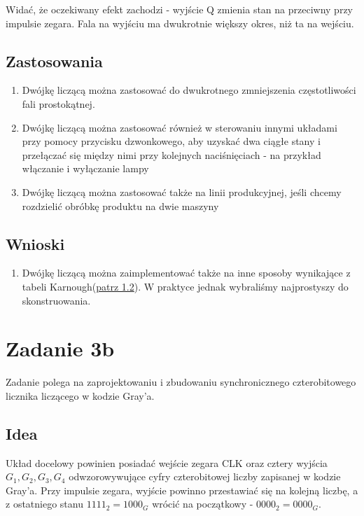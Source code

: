 \documentclass[12pt,a4paper,table]{article}
\begin{document}
    Widać, że oczekiwany efekt zachodzi - wyjście Q zmienia stan na przeciwny przy impulsie zegara.
    Fala na wyjściu ma dwukrotnie większy okres, niż ta na wejściu.

    \subsection{Zastosowania}
    \begin{enumerate}
        \item Dwójkę liczącą można zastosować do dwukrotnego zmniejszenia częstotliwości fali
        prostokątnej.

        \item Dwójkę liczącą można zastosować również w sterowaniu innymi układami przy pomocy
        przycisku dzwonkowego, aby uzyskać dwa ciągłe stany i przełączać się między nimi przy
        kolejnych naciśnięciach - na przykład włączanie i wyłączanie lampy

        \item Dwójkę liczącą można zastosować także na linii produkcyjnej, jeśli chcemy rozdzielić
        obróbkę produktu na dwie maszyny
    \end{enumerate}

    \subsection{Wnioski}
    \begin{enumerate}
        \item Dwójkę liczącą można zaimplementować także na inne sposoby wynikające z tabeli Karnough(\hyperref[solution]{patrz 1.2}).
        W praktyce jednak wybraliśmy najprostyszy do skonstruowania.
    \end{enumerate}





    \pagebreak
    \section{Zadanie 3b}
    Zadanie polega na zaprojektowaniu i zbudowaniu synchronicznego czterobitowego licznika
    liczącego w kodzie Gray'a.

    \subsection{Idea}
    Układ docelowy powinien posiadać wejście zegara CLK oraz cztery wyjścia
    $G_1, G_2, G_3, G_4$ odwzorowywujące cyfry czterobitowej liczby zapisanej w kodzie Gray'a.
    Przy impulsie zegara, wyjście powinno przestawiać się na kolejną liczbę, a z ostatniego
    stanu $1111_2 = 1000_G$ wrócić na początkowy - $0000_2 = 0000_G$.
\end{document}
